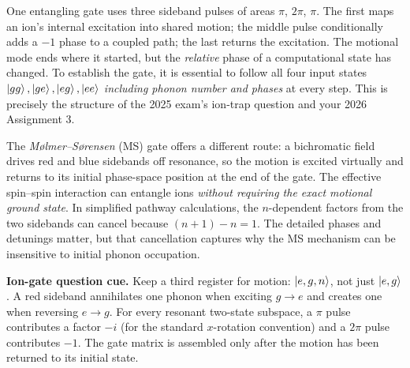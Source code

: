 One entangling gate uses three sideband pulses of areas $\pi$, $2\pi$, $\pi$. The first maps an ion's internal excitation into shared motion; the middle pulse conditionally adds a $-1$ phase to a coupled path; the last returns the excitation. The motional mode ends where it started, but the \emph{relative} phase of a computational state has changed. To establish the gate, it is essential to follow all four input states $\left\lvert gg\right\rangle,\left\lvert ge\right\rangle,\left\lvert eg\right\rangle,\left\lvert ee\right\rangle$ \emph{including phonon number and phases} at every step. This is precisely the structure of the 2025 exam's ion-trap question and your 2026 Assignment 3.

The \emph{M\o lmer--S\o rensen} (MS) gate offers a different route: a bichromatic field drives red and blue sidebands off resonance, so the motion is excited virtually and returns to its initial phase-space position at the end of the gate. The effective spin--spin interaction can entangle ions \emph{without requiring the exact motional ground state}. In simplified pathway calculations, the $n$-dependent factors from the two sidebands can cancel because $(n+1)-n=1$. The detailed phases and detunings matter, but that cancellation captures why the MS mechanism can be insensitive to initial phonon occupation.

\begin{examtip}
\textbf{Ion-gate question cue.} Keep a third register for motion: $\left\lvert e,g,n\right\rangle$, not just $\left\lvert e,g\right\rangle$. A red sideband annihilates one phonon when exciting $g\to e$ and creates one when reversing $e\to g$. For every resonant two-state subspace, a $\pi$ pulse contributes a factor $-i$ (for the standard $x$-rotation convention) and a $2\pi$ pulse contributes $-1$. The gate matrix is assembled only after the motion has been returned to its initial state.
\end{examtip}

